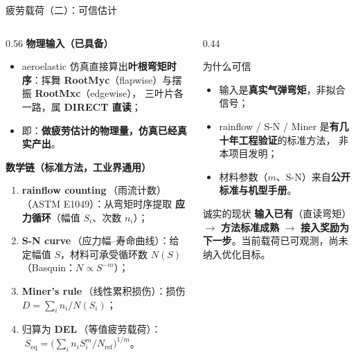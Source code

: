 \documentclass[aspectratio=169,10pt,UTF8]{ctexbeamer}
\newcommand{\hl}[1]{{\color{myblue}\bfseries #1}}
\newcommand{\hlr}[1]{{\color{myred}\bfseries #1}}
\newcommand{\hlg}[1]{{\color{mygreen}\bfseries #1}}
\newcommand{\term}[2]{\textbf{#1}\,（#2）}
\begin{document}
\begin{frame}{疲劳载荷（二）：可信估计}
  \begin{columns}[T]
    \begin{column}{0.56\textwidth}
      \textbf{物理输入（已具备）}
      \begin{itemize}\scriptsize
        \item aeroelastic 仿真直接算出\hlg{叶根弯矩时序}：挥舞
              \textbf{RootMyc}（flapwise）与摆振 \textbf{RootMxc}（edgewise），
              三叶片各一路，属 \hlg{DIRECT 直读}；
        \item 即：\textbf{做疲劳估计的物理量，仿真已经真实产出}。
      \end{itemize}
      \vspace{0.3em}
      \textbf{数学链（标准方法，工业界通用）}
      \begin{enumerate}\scriptsize
        \item \term{rainflow counting}{雨流计数}（ASTM E1049）：从弯矩时序提取
              \textbf{应力循环}（幅值 $S_i$、次数 $n_i$）；
        \item \term{S-N curve}{应力幅–寿命曲线}：给定幅值 $S$，材料可承受循环数
              $N(S)$（Basquin：$N \propto S^{-m}$）；
        \item \term{Miner's rule}{线性累积损伤}：损伤 $D=\sum_i n_i/N(S_i)$；
        \item 归算为 \term{DEL}{等值疲劳载荷}：$\;S_{\text{eq}}=\big(\sum_i n_i
              S_i^{m}/N_{\text{ref}}\big)^{1/m}$。
      \end{enumerate}
    \end{column}
    \begin{column}{0.44\textwidth}
      \begin{block}{为什么可信}
        \scriptsize
        \begin{itemize}\scriptsize
          \item 输入是\textbf{真实气弹弯矩}，非拟合信号；
          \item rainflow / S-N / Miner 是\textbf{有几十年工程验证}的标准方法，
                非本项目发明；
          \item 材料参数（$m$、S-N）来自\textbf{公开标准与机型手册}。
        \end{itemize}
      \end{block}
      \vspace{-0.2em}
      \begin{block}{诚实的现状}
        \scriptsize \hlg{输入已有}（直读弯矩）$\to$ \hl{方法标准成熟} $\to$
        \hlr{接入奖励为下一步}。当前载荷已可观测，尚未纳入优化目标。
      \end{block}
    \end{column}
  \end{columns}
\end{frame}
\end{document}
